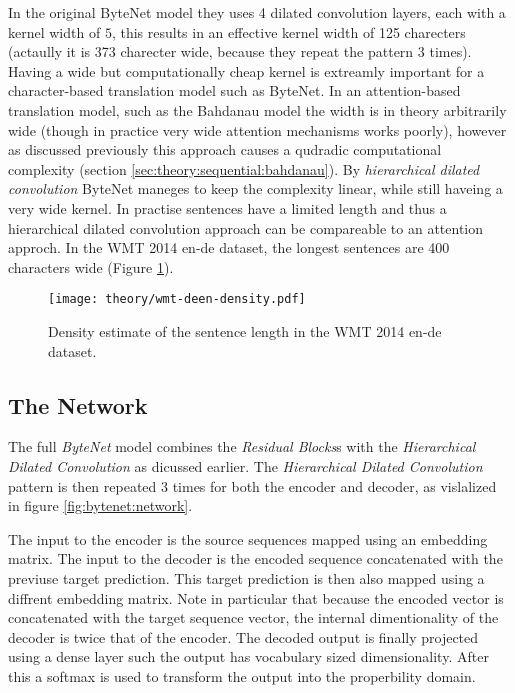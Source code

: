 In the original ByteNet model they uses 4 dilated convolution layers, each with a kernel width of $5$, this results in an effective kernel width of 125 charecters (actaully it is 373 charecter wide, because they repeat the pattern 3 times). Having a wide but computationally cheap kernel is extreamly important for a character-based translation model such as ByteNet. In an attention-based translation model, such as the Bahdanau model \cite{bahdanau-nmt} the width is in theory arbitrarily wide (though in practice very wide attention mechanisms works poorly), however as discussed previously this approach causes a qudradic computational complexity (section \ref{sec:theory:sequential:bahdanau}). By \textit{hierarchical dilated convolution} ByteNet maneges to keep the complexity linear, while still haveing a very wide kernel. In practise sentences have a limited length and thus a hierarchical dilated convolution approach can be compareable to an attention approch. In the WMT 2014 en-de dataset, the longest sentences are 400 characters wide (Figure \ref{fig:bytenet:wmt-deen-density}).

\begin{figure}[h]
    \centering
    \texttt{[image: theory/wmt-deen-density.pdf]}
    \caption{Density estimate of the sentence length in the WMT 2014 en-de dataset.}
    \label{fig:bytenet:wmt-deen-density}
\end{figure}

\subsection{The Network}

The full \textit{ByteNet} model combines the \textit{Residual Blocks}s with the \textit{Hierarchical Dilated Convolution} as dicussed earlier. The \textit{Hierarchical Dilated Convolution} pattern is then repeated 3 times for both the encoder and decoder, as vislalized in figure \ref{fig:bytenet:network}.

The input to the encoder is the source sequences mapped using an embedding matrix. The input to the decoder is the encoded sequence concatenated with the previuse target prediction. This target prediction is then also mapped using a diffrent embedding matrix. Note in particular that because the encoded vector is concatenated with the target sequence vector, the internal dimentionality of the decoder is twice that of the encoder. The decoded output is finally projected using a dense layer such the output has vocabulary sized dimensionality. After this a softmax is used to transform the output into the properbility domain.

